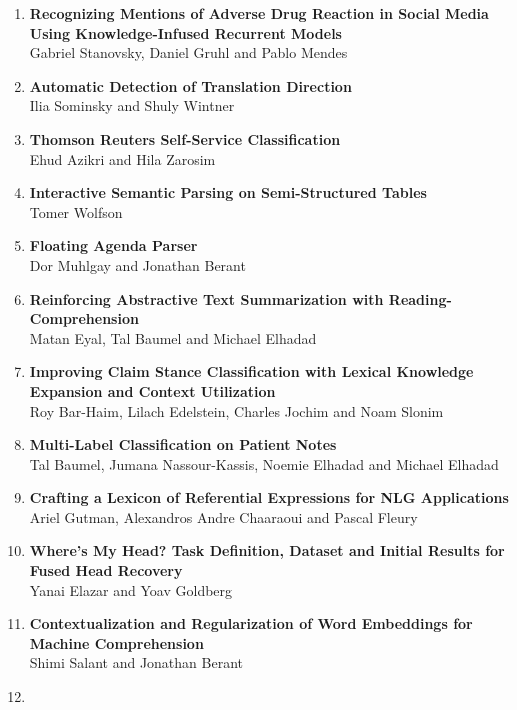 \documentclass[a0,portrait]{a0poster}
\begin{document}
{\begin{multicols}{2}
\begin{enumerate}
        Elior Sulem, Omri Abend and Ari Rappoport
        \item
        \textbf{Recognizing Mentions of Adverse Drug Reaction in Social Media
        Using Knowledge-Infused Recurrent Models}\\
        Gabriel Stanovsky, Daniel Gruhl and Pablo Mendes
        \item
        \textbf{Automatic Detection of Translation Direction}\\
        Ilia Sominsky and Shuly Wintner
        \item
        \textbf{Thomson Reuters Self-Service Classification}\\
        Ehud Azikri and Hila Zarosim
        \item
        \textbf{Interactive Semantic Parsing on Semi-Structured Tables}\\
        Tomer Wolfson
        \item
        \textbf{Floating Agenda Parser}\\
        Dor Muhlgay and Jonathan Berant
        \item
        \textbf{Reinforcing Abstractive Text Summarization with
        Reading-Comprehension}\\
        Matan Eyal, Tal Baumel and Michael Elhadad
        \item
        \textbf{Improving Claim Stance Classification with Lexical Knowledge
        Expansion and Context Utilization}\\
        Roy Bar-Haim, Lilach Edelstein, Charles Jochim and Noam Slonim
        \item
        \textbf{Multi-Label Classification on Patient Notes}\\
        Tal Baumel, Jumana Nassour-Kassis, Noemie Elhadad and Michael Elhadad
        \item
        \textbf{Crafting a Lexicon of Referential Expressions for NLG Applications}\\
        Ariel Gutman, Alexandros Andre Chaaraoui and Pascal Fleury
        \item
        \textbf{Where's My Head?
        Task Definition, Dataset and Initial Results for Fused Head Recovery}\\
        Yanai Elazar and Yoav Goldberg
        \item
        \textbf{Contextualization and Regularization of Word Embeddings for
        Machine Comprehension}\\
        Shimi Salant and Jonathan Berant
        \item

\end{enumerate}
\end{multicols}}
\end{document}
